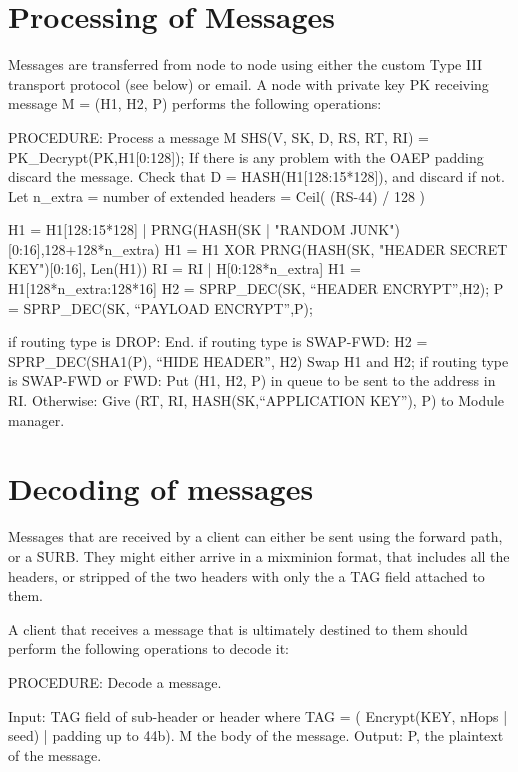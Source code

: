 \section{Processing of Messages}

Messages are transferred from node to node using either the custom Type
III transport protocol (see below) or email.  A node with private key
PK receiving message M = (H1, H2, P) performs the following operations:

PROCEDURE: Process a message M
	SHS(V, SK, D, RS, RT, RI) = PK_Decrypt(PK,H1[0:128]);
        If there is any problem with the OAEP padding discard the message.
        Check that D = HASH(H1[128:15*128]), and discard if not.
        Let n_extra = number of extended headers = Ceil( (RS-44) / 128 )
                  
        H1 = H1[128:15*128] | PRNG(HASH(SK | "RANDOM 
                                               JUNK")[0:16],128+128*n_extra)
	H1 = H1 XOR PRNG(HASH(SK, "HEADER SECRET KEY")[0:16], Len(H1))
        RI = RI | H[0:128*n_extra]
        H1 = H1[128*n_extra:128*16]
	H2 = SPRP_DEC(SK, ``HEADER ENCRYPT'',H2);
	P = SPRP_DEC(SK, ``PAYLOAD ENCRYPT'',P);

	if routing type is DROP:
                End.
	if routing type is SWAP-FWD:
		H2 = SPRP_DEC(SHA1(P), ``HIDE HEADER'', H2)
		Swap H1 and H2;
        if routing type is SWAP-FWD or FWD:
	   	Put (H1, H2, P) in queue to be sent to the address in RI.
        Otherwise:
		Give (RT, RI, HASH(SK,``APPLICATION KEY''), P) to
Module manager. 

\section{Decoding of messages}

Messages that are received by a client can either be sent using the
forward path, or a SURB. They might either arrive in a mixminion
format, that includes all the headers, or stripped of the two headers
with only the a TAG field attached to them.

A client that receives a message that is ultimately destined to them
should perform the following operations to decode it:

PROCEDURE: Decode a message.

Input:  TAG field of sub-header or header where 
        TAG = ( Encrypt(KEY, nHops | seed) | padding up to 44b).
        M the body of the message.
Output: P, the plaintext of the message.

